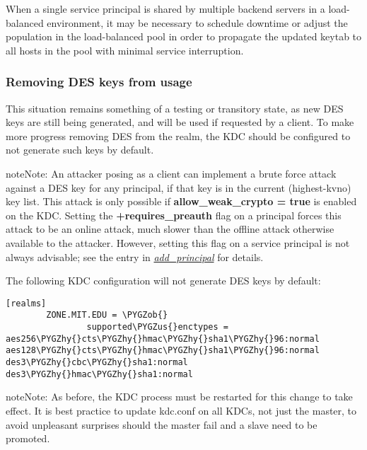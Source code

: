 \documentclass[letterpaper,10pt,english]{sphinxmanual}
\def\PYGZus{\char`\_}
\def\PYGZob{\char`\{}
\def\PYGZhy{\char`\-}
\begin{document}
When a single service principal is shared by multiple backend servers in
a load-balanced environment, it may be necessary to schedule downtime
or adjust the population in the load-balanced pool in order to propagate
the updated keytab to all hosts in the pool with minimal service interruption.


\subsubsection{Removing DES keys from usage}
\label{admin/advanced/retiring-des:removing-des-keys-from-usage}
This situation remains something of a testing or transitory state,
as new DES keys are still being generated, and will be used if requested
by a client.  To make more progress removing DES from the realm, the KDC
should be configured to not generate such keys by default.

\begin{notice}{note}{Note:}
An attacker posing as a client can implement a brute force attack against
a DES key for any principal, if that key is in the current (highest-kvno)
key list.  This attack is only possible if \textbf{allow\_weak\_crypto = true}
is enabled on the KDC.  Setting the \textbf{+requires\_preauth} flag on a
principal forces this attack to be an online attack, much slower than
the offline attack otherwise available to the attacker.  However, setting
this flag on a service principal is not always advisable; see the entry in
{\hyperref[admin/admin_commands/kadmin_local:add-principal]{\emph{add\_principal}}} for details.
\end{notice}

The following KDC configuration will not generate DES keys by default:

\begin{Verbatim}[commandchars=\\\{\}]
[realms]
        ZONE.MIT.EDU = \PYGZob{}
                supported\PYGZus{}enctypes = aes256\PYGZhy{}cts\PYGZhy{}hmac\PYGZhy{}sha1\PYGZhy{}96:normal aes128\PYGZhy{}cts\PYGZhy{}hmac\PYGZhy{}sha1\PYGZhy{}96:normal des3\PYGZhy{}cbc\PYGZhy{}sha1:normal des3\PYGZhy{}hmac\PYGZhy{}sha1:normal
\end{Verbatim}

\begin{notice}{note}{Note:}
As before, the KDC process must be restarted for this change to take
effect.  It is best practice to update kdc.conf on all KDCs, not just the
master, to avoid unpleasant surprises should the master fail and a slave
need to be promoted.
\end{notice}
\end{document}
